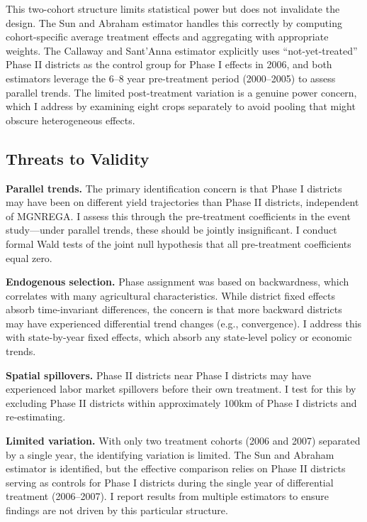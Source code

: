 \documentclass[12pt]{article}
\begin{document}
This two-cohort structure limits statistical power but does not invalidate the design. The Sun and Abraham estimator handles this correctly by computing cohort-specific average treatment effects and aggregating with appropriate weights. The Callaway and Sant'Anna estimator explicitly uses ``not-yet-treated'' Phase II districts as the control group for Phase I effects in 2006, and both estimators leverage the 6--8 year pre-treatment period (2000--2005) to assess parallel trends. The limited post-treatment variation is a genuine power concern, which I address by examining eight crops separately to avoid pooling that might obscure heterogeneous effects.

\subsection{Threats to Validity}

\textbf{Parallel trends.} The primary identification concern is that Phase I districts may have been on different yield trajectories than Phase II districts, independent of MGNREGA. I assess this through the pre-treatment coefficients in the event study---under parallel trends, these should be jointly insignificant. I conduct formal Wald tests of the joint null hypothesis that all pre-treatment coefficients equal zero.

\textbf{Endogenous selection.} Phase assignment was based on backwardness, which correlates with many agricultural characteristics. While district fixed effects absorb time-invariant differences, the concern is that more backward districts may have experienced differential trend changes (e.g., convergence). I address this with state-by-year fixed effects, which absorb any state-level policy or economic trends.

\textbf{Spatial spillovers.} Phase II districts near Phase I districts may have experienced labor market spillovers before their own treatment. I test for this by excluding Phase II districts within approximately 100km of Phase I districts and re-estimating.

\textbf{Limited variation.} With only two treatment cohorts (2006 and 2007) separated by a single year, the identifying variation is limited. The Sun and Abraham estimator is identified, but the effective comparison relies on Phase II districts serving as controls for Phase I districts during the single year of differential treatment (2006--2007). I report results from multiple estimators to ensure findings are not driven by this particular structure.
\end{document}
